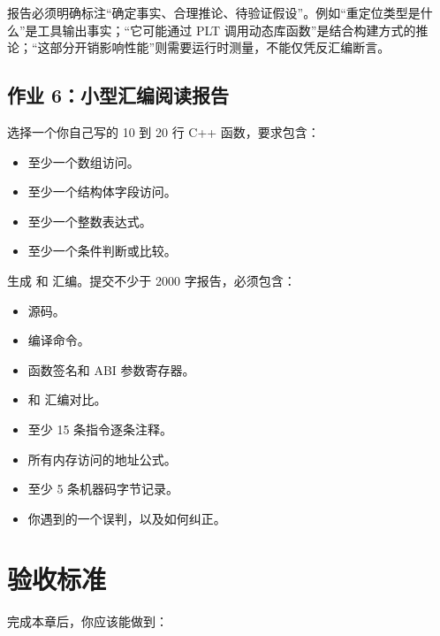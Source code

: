 \begin{exercisebox}
报告必须明确标注“确定事实、合理推论、待验证假设”。例如“重定位类型是什么”是工具输出事实；“它可能通过 PLT 调用动态库函数”是结合构建方式的推论；“这部分开销影响性能”则需要运行时测量，不能仅凭反汇编断言。

\subsection*{作业 6：小型汇编阅读报告}

选择一个你自己写的 10 到 20 行 C++ 函数，要求包含：

\begin{itemize}
  \item 至少一个数组访问。
  \item 至少一个结构体字段访问。
  \item 至少一个整数表达式。
  \item 至少一个条件判断或比较。
\end{itemize}

生成  和  汇编。提交不少于 2000 字报告，必须包含：

\begin{itemize}
  \item 源码。
  \item 编译命令。
  \item 函数签名和 ABI 参数寄存器。
  \item {} 和  汇编对比。
  \item 至少 15 条指令逐条注释。
  \item 所有内存访问的地址公式。
  \item 至少 5 条机器码字节记录。
  \item 你遇到的一个误判，以及如何纠正。
\end{itemize}
\end{exercisebox}

\section{验收标准}

完成本章后，你应该能做到：

